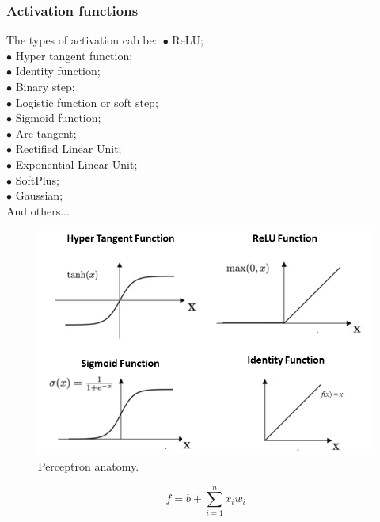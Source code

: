 \documentclass[xcolor=dvipsnames,10pt,aspectratio=169]{beamer}
\begin{document}
\begin{frame}
	\frametitle{Activation functions}
	\begin{minipage}[h!]{0.45\textwidth}
		The types of activation cab be:\ 
		$\bullet$ ReLU;\\
		$\bullet$ Hyper tangent function;\\
		$\bullet$ Identity function;\\
		$\bullet$ Binary step;\\
		$\bullet$ Logistic function or soft step;\\
		$\bullet$ Sigmoid function;\\
		$\bullet$ Arc tangent;\\
		$\bullet$ Rectified Linear Unit;\\
		$\bullet$ Exponential Linear Unit;\\
		$\bullet$ SoftPlus;\\
		$\bullet$ Gaussian;\\
		And others...

	\end{minipage}
	\begin{minipage}[h!]{0.45\textwidth}
	\begin{figure}[h!]
		\centering
		\includegraphics[trim = {0cm 0cm 0cm 0cm}, clip , angle=0, scale=0.26]{./figuras/activation_functions.png}
		\caption{Perceptron anatomy.}
	\end{figure}
	\begin{equation}
		f = b + \sum^n_{i=1} x_i w_i
	\end{equation}
	\end{minipage}
\end{frame}
\end{document}
